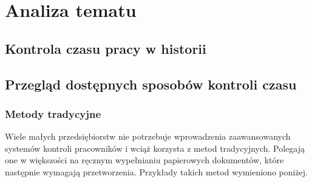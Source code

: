 





\chapter{Analiza tematu}

\section{Kontrola czasu pracy w historii}


\section{Przegląd dostępnych sposobów kontroli czasu}

\subsection{Metody tradycyjne}

Wiele małych przedsiębiorstw nie potrzebuje wprowadzenia zaawansowanych systemów kontroli pracowników i wciąż korzysta z metod tradycyjnych. Polegają one w większości na ręcznym wypełnianiu papierowych dokumentów, które następnie wymagają przetworzenia. Przykłady takich metod wymieniono poniżej.

